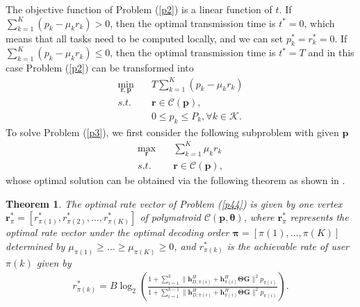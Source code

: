 \documentclass[journal]{IEEEtran}
\newtheorem{theorem}{\bf Theorem}
\begin{document}
 The objective function of Problem (\ref{p2}) is a linear function of $t$. If $\sum_{k=1}^K (p_k-\mu_kr_k)> 0$, then the optimal transmission time is $t^*=0$, which means that all tasks need to be computed locally, and we can set $p^*_k=r^*_k=0$. If $\sum_{k=1}^K (p_k-\mu_kr_k)\leq 0$, then the optimal transmission time is $t^*=T$ and in this case Problem (\ref{p2}) can be transformed into
\begin{subequations}\label{p3}
	\begin{align}
	\mathop{\min}_{\pmb r,\pmb p}\quad &T\sum_{k=1}^K\left(p_k-\mu_kr_k\right)\\
	s.t. \quad &\pmb r \in \mathcal C(\pmb p),\\
	&0\leq p_k \leq P_k, \forall k \in \mathcal K.
	\end{align}
\end{subequations}
{To solve Problem (\ref{p3}), we first consider the following subproblem with given $\pmb p$
\begin{subequations}\label{p44}
	\begin{align}
		\mathop{\max}_{\pmb r}\quad &\sum_{k=1}^K\mu_kr_k\\
		s.t. \quad &\pmb r \in \mathcal C(\pmb p),
	\end{align}
\end{subequations}
whose optimal solution can be obtained via the following theorem as shown in \cite{leD}.}


\begin{theorem}
{	The optimal rate vector of Problem (\ref{p44})
	is given by one vertex $\pmb r^*_{\pi}=\left[r^*_{\pi(1)},r^*_{\pi(2)},\dots,r^*_{\pi(K)}\right]$ of polymatroid $\mathcal C(\pmb p, \pmb \theta)$, where $\pmb r^*_{\pi}$ represents the optimal rate vector under the optimal decoding order $\pmb\pi=[\pi(1),\dots,\pi(K)]$ determined by $\mu_{\pi(1)}\geq\dots\geq\mu_{\pi(K)}\geq 0$, and $r^*_{\pi(k)}$ is the achievable rate of user $\pi(k)$ given by \cite{tse2005fundamentals}}
	{\begin{align}\label{rates}
			r^*_{\pi(k)}=B\log_2\left(\frac{1+ \sum_{i=1}^k {\|\pmb h_{D,\pi(i)}^{H}+\pmb h_{\pi(i)}^{H} \pmb \Theta \pmb G}\|^2 {p_{\pi(i)}}}{1+ \sum_{i=1}^{k-1} { \|\pmb h_{D,\pi(i)}^{H}+\pmb h_{\pi(i)}^{H} \pmb \Theta \pmb G}\|^2 {p_{\pi(i)}}}\right).
	\end{align}}
\end{theorem}	
\end{document}
